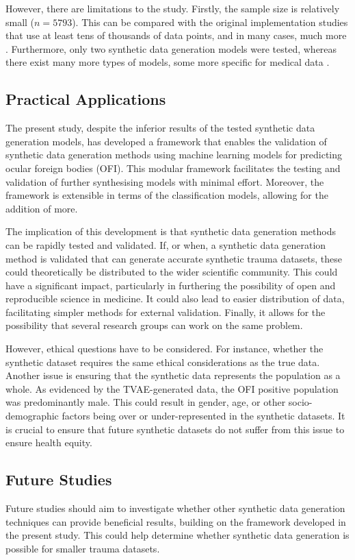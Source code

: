 \documentclass[12pt, a4paper]{article}
\begin{document}
However, there are limitations to the study. Firstly, the sample size is relatively small ($n = 5793$). This can be
compared with the original implementation studies that use at least tens of thousands of data points, and in many
cases, much more \cite{xu_modeling_2019,karras_training_2020}. Furthermore, only two synthetic data generation models
were tested, whereas there exist many more types of models, some more specific for medical data
\cite{hernandez_synthetic_2022}.

\subsection{Practical Applications}
The present study, despite the inferior results of the tested synthetic data generation models, has developed a
framework that enables the validation of synthetic data generation methods using machine learning models for predicting
ocular foreign bodies (OFI). This modular framework facilitates the testing and validation of further synthesising
models with minimal effort. Moreover, the framework is extensible in terms of the classification models, allowing for
the addition of more.

The implication of this development is that synthetic data generation methods can be rapidly tested and validated. If,
or when, a synthetic data generation method is validated that can generate accurate synthetic trauma datasets, these
could theoretically be distributed to the wider scientific community. This could have a significant impact,
particularly in furthering the possibility of open and reproducible science in medicine. It could also lead to easier
distribution of data, facilitating simpler methods for external validation. Finally, it allows for the possibility that
several research groups can work on the same problem.

However, ethical questions have to be considered. For instance, whether the synthetic dataset requires the same ethical
considerations as the true data. Another issue is ensuring that the synthetic data represents the population as a
whole. As evidenced by the TVAE-generated data, the OFI positive population was predominantly male. This could result
in gender, age, or other socio-demographic factors being over or under-represented in the synthetic datasets. It is
crucial to ensure that future synthetic datasets do not suffer from this issue to ensure health equity.

\subsection{Future Studies}
Future studies should aim to investigate whether other synthetic data generation techniques can provide beneficial
results, building on the framework developed in the present study. This could help determine whether synthetic data
generation is possible for smaller trauma datasets.
\end{document}
